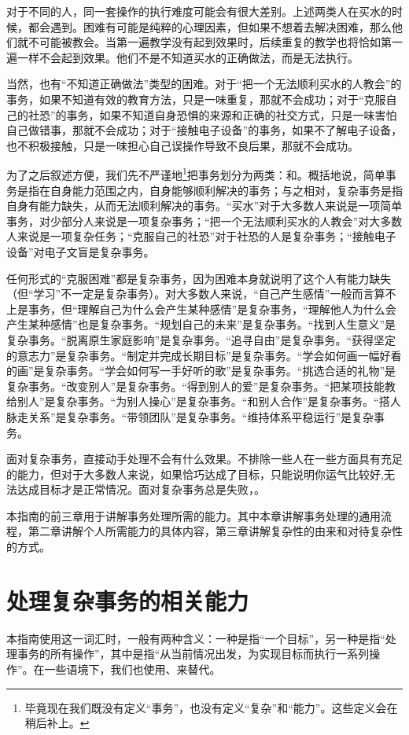 对于不同的人，同一套操作的执行难度可能会有很大差别。上述两类人在买水的时候，都会遇到。困难有可能是纯粹的心理因素，但如果不想着去解决困难，那么他们就不可能被教会。当第一遍教学没有起到效果时，后续重复的教学也将恰如第一遍一样不会起到效果。他们不是不知道买水的正确做法，而是无法执行。

当然，也有“不知道正确做法”类型的困难。对于“把一个无法顺利买水的人教会”的事务，如果不知道有效的教育方法，只是一味重复，那就不会成功；对于“克服自己的社恐”的事务，如果不知道自身恐惧的来源和正确的社交方式，只是一味害怕自己做错事，那就不会成功；对于“接触电子设备”的事务，如果不了解电子设备，也不积极接触，只是一味担心自己误操作导致不良后果，那就不会成功。

为了之后叙述方便，我们先不严谨地\footnote{毕竟现在我们既没有定义“事务”，也没有定义“复杂”和“能力”。这些定义会在稍后补上。}把事务划分为两类：和。概括地说，简单事务是指在自身能力范围之内，自身能够顺利解决的事务；与之相对，复杂事务是指自身有能力缺失，从而无法顺利解决的事务。“买水”对于大多数人来说是一项简单事务，对少部分人来说是一项复杂事务；“把一个无法顺利买水的人教会”对大多数人来说是一项复杂任务；“克服自己的社恐”对于社恐的人是复杂事务；“接触电子设备”对电子文盲是复杂事务。

\begin{examples}
任何形式的“克服困难”都是复杂事务，因为困难本身就说明了这个人有能力缺失（但“学习”不一定是复杂事务）。对大多数人来说，“自己产生感情”一般而言算不上是事务，但“理解自己为什么会产生某种感情”是复杂事务，“理解他人为什么会产生某种感情”也是复杂事务。“规划自己的未来”是复杂事务。“找到人生意义”是复杂事务。“脱离原生家庭影响”是复杂事务。“追寻自由”是复杂事务。“获得坚定的意志力”是复杂事务。“制定并完成长期目标”是复杂事务。“学会如何画一幅好看的画”是复杂事务。“学会如何写一手好听的歌”是复杂事务。“挑选合适的礼物”是复杂事务。“改变别人”是复杂事务。“得到别人的爱”是复杂事务。“把某项技能教给别人”是复杂事务。“为别人操心”是复杂事务。“和别人合作”是复杂事务。“搭人脉走关系”是复杂事务。“带领团队”是复杂事务。“维持体系平稳运行”是复杂事务。
\end{examples}
面对复杂事务，直接动手处理不会有什么效果。不排除一些人在一些方面具有充足的能力，但对于大多数人来说，如果恰巧达成了目标，只能说明你运气比较好,无法达成目标才是正常情况。面对复杂事务总是失败，。

本指南的前三章用于讲解事务处理所需的能力。其中本章讲解事务处理的通用流程，第二章讲解个人所需能力的具体内容，第三章讲解复杂性的由来和对待复杂性的方式。

\section{处理复杂事务的相关能力\label{sec:现实事务处理能力}}
本指南使用这一词汇时，一般有两种含义：一种是指“一个目标”，另一种是指“处理事务的所有操作”，其中是指“从当前情况出发，为实现目标而执行一系列操作”。在一些语境下，我们也使用、来替代。

